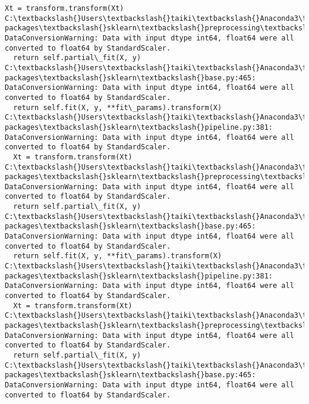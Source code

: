 \documentclass[a4j, dvipdfmx]{jsarticle}
\begin{document}
\begin{Verbatim}[commandchars=\\\{\}]
  Xt = transform.transform(Xt)
C:\textbackslash{}Users\textbackslash{}taiki\textbackslash{}Anaconda3\textbackslash{}Lib\textbackslash{}site-packages\textbackslash{}sklearn\textbackslash{}preprocessing\textbackslash{}data.py:625: DataConversionWarning: Data with input dtype int64, float64 were all converted to float64 by StandardScaler.
  return self.partial\_fit(X, y)
C:\textbackslash{}Users\textbackslash{}taiki\textbackslash{}Anaconda3\textbackslash{}Lib\textbackslash{}site-packages\textbackslash{}sklearn\textbackslash{}base.py:465: DataConversionWarning: Data with input dtype int64, float64 were all converted to float64 by StandardScaler.
  return self.fit(X, y, **fit\_params).transform(X)
C:\textbackslash{}Users\textbackslash{}taiki\textbackslash{}Anaconda3\textbackslash{}Lib\textbackslash{}site-packages\textbackslash{}sklearn\textbackslash{}pipeline.py:381: DataConversionWarning: Data with input dtype int64, float64 were all converted to float64 by StandardScaler.
  Xt = transform.transform(Xt)
C:\textbackslash{}Users\textbackslash{}taiki\textbackslash{}Anaconda3\textbackslash{}Lib\textbackslash{}site-packages\textbackslash{}sklearn\textbackslash{}preprocessing\textbackslash{}data.py:625: DataConversionWarning: Data with input dtype int64, float64 were all converted to float64 by StandardScaler.
  return self.partial\_fit(X, y)
C:\textbackslash{}Users\textbackslash{}taiki\textbackslash{}Anaconda3\textbackslash{}Lib\textbackslash{}site-packages\textbackslash{}sklearn\textbackslash{}base.py:465: DataConversionWarning: Data with input dtype int64, float64 were all converted to float64 by StandardScaler.
  return self.fit(X, y, **fit\_params).transform(X)
C:\textbackslash{}Users\textbackslash{}taiki\textbackslash{}Anaconda3\textbackslash{}Lib\textbackslash{}site-packages\textbackslash{}sklearn\textbackslash{}pipeline.py:381: DataConversionWarning: Data with input dtype int64, float64 were all converted to float64 by StandardScaler.
  Xt = transform.transform(Xt)
C:\textbackslash{}Users\textbackslash{}taiki\textbackslash{}Anaconda3\textbackslash{}Lib\textbackslash{}site-packages\textbackslash{}sklearn\textbackslash{}preprocessing\textbackslash{}data.py:625: DataConversionWarning: Data with input dtype int64, float64 were all converted to float64 by StandardScaler.
  return self.partial\_fit(X, y)
C:\textbackslash{}Users\textbackslash{}taiki\textbackslash{}Anaconda3\textbackslash{}Lib\textbackslash{}site-packages\textbackslash{}sklearn\textbackslash{}base.py:465: DataConversionWarning: Data with input dtype int64, float64 were all converted to float64 by StandardScaler.

\end{Verbatim}
\end{document}
